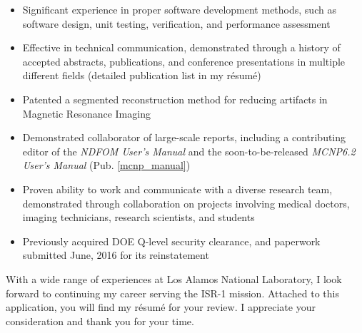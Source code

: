 \begin{center}
\begin{minipage}{\textwidth}
\begin{itemize}[leftmargin=.15in,rightmargin=.25in,itemsep=1.0mm]
	\item Significant experience in proper software development methods, such as software design, unit testing, verification, and performance assessment
		
	\item Effective in technical communication, demonstrated through a history of accepted abstracts, publications, and conference presentations in multiple different fields (detailed publication list in my r\'{e}sum\'{e})
	\item Patented a segmented reconstruction method for reducing artifacts in Magnetic Resonance Imaging
	\item Demonstrated collaborator of large-scale reports, including a contributing editor of the \textit{NDFOM User's Manual} and the soon-to-be-released \textit{MCNP6.2 User's Manual} (Pub. \ref{mcnp_manual})
	
	\item Proven ability to work and communicate with a diverse research team, demonstrated through collaboration on projects involving medical doctors, imaging technicians, research scientists, and students
		
	\item Previously acquired DOE Q-level security clearance, and paperwork submitted June, 2016 for its reinstatement
  \end{itemize} 

  \vspace{3mm}
  With a wide range of experiences at Los Alamos National Laboratory, I look forward to continuing my career serving the ISR-1 mission.
  Attached to this application, you will find my r\'{e}sum\'{e} for your review. I appreciate your consideration and thank you for your time.
  

\end{minipage}
\end{center}
